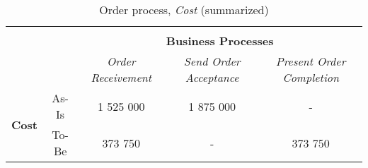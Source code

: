 \begin{table}[H]
\begin{tabular}{|c|c|p{2cm}|p{2.5cm}|p{2.5cm}|p{2.5cm}|}
		\multicolumn{6}{c}{} \\ \cline{3-6}
		\multicolumn{2}{c}{} & \multicolumn{4}{|c|}{\textbf{Business Processes}} \\ \cline{3-6}
		\multicolumn{2}{c|}{} & \multicolumn{1}{c|}{\textsl{Order Receivement}} & \multicolumn{2}{c|}{\textsl{Send Order Acceptance}} & \multicolumn{1}{c|}{\textsl{Present Order Completion}} \\
		\hline
		\multirow{2}{*}{\textbf{Cost}} & As-Is & \multicolumn{1}{c|}{1 525 000} & \multicolumn{2}{c|}{1 875 000} & \multicolumn{1}{c|}{-} \\ \cline{2-6}
		& To-Be & \multicolumn{1}{c|}{373 750} & \multicolumn{2}{c|}{-} & \multicolumn{1}{c|}{373 750} \\ \hline
	\end{tabular}
\caption{Order process, \textsl{Cost} (summarized)} 
\label{tab:order_cost_both}
\end{table}